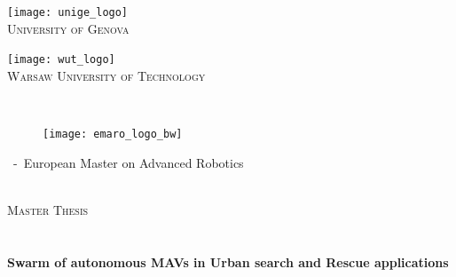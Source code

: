 \begin{titlepage}
\begin{center}

\begin{minipage}{0.4\textwidth}
\begin{flushleft}
\centering
\texttt{[image: unige\_logo]}~\\[0.1cm]
\textsc{University of Genova}
\end{flushleft}
\end{minipage}
\begin{minipage}{0.4\textwidth}
\begin{flushright}
\centering
\texttt{[image: wut\_logo]}~\\[0.1cm]
\textsc{Warsaw University of Technology}
\end{flushright}
\end{minipage}

~\\[2.0cm]

\begin{minipage}{0.14\textwidth}
\vspace{0pt}
\begin{figure}[H]
    \texttt{[image: emaro\_logo\_bw]}
\end{figure}
\end{minipage}
\begin{minipage}{0.7\textwidth}
\vspace{17pt}
{\Large ~-~European Master on Advanced Robotics}
\end{minipage}

~\\[0.6cm]

 
\textsc{\Large Master Thesis}\\[0.6cm]

~\\[1.0cm]

\HRule \\[0.4cm]
{\LARGE \bfseries Swarm of autonomous MAVs in Urban search and Rescue applications \\[0.4cm]}
\HRule \\[1.5cm]


\end{center}
\end{titlepage}
